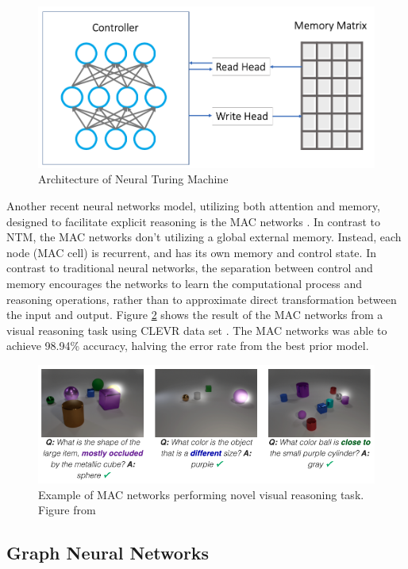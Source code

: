 \documentclass[journal]{IEEEtran}
\begin{document}
\begin{figure}[htb]
  \includegraphics[width=\linewidth]{NTM.png}
  \caption{Architecture of Neural Turing Machine}
  \label{NTM}
\end{figure}

Another recent neural networks model, utilizing both attention and memory, designed to facilitate explicit reasoning is the MAC networks \cite{hudson2018compositional}.
In contrast to NTM, the MAC networks don't utilizing a global external memory. Instead, each node (MAC cell) is recurrent, and has its own memory and control state.
In contrast to traditional neural networks, the separation between control and memory encourages the networks to 
learn the computational process and reasoning operations, rather than to approximate direct transformation between the input and output.
Figure \ref{mac-clevr} shows the result of the MAC networks from a visual reasoning task using CLEVR data set \cite{johnson2017clevr}. 
The MAC networks was able to achieve 98.94\% accuracy, halving the error rate from the best prior model.
\begin{figure}[htb]
  \includegraphics[width=\linewidth]{mac-clevr.png}
  \caption{Example of MAC networks performing novel visual reasoning task. Figure from \cite{hudson2018compositional}}
  \label{mac-clevr}
\end{figure}

\subsection{Graph Neural Networks}
\end{document}

